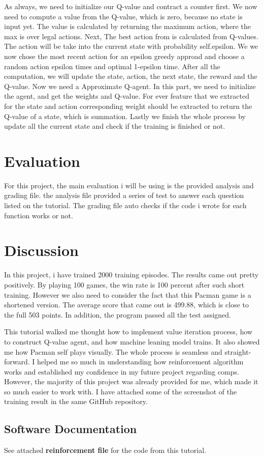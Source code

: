 \documentclass[10pt,twocolumn]{article}
\begin{document}
    As always, we need to initialize our Q-value and contract a counter first. We now need to compute a value from the Q-value, which is zero, because no state is input yet. The value is calculated by returning the maximum action, where the max is over legal actions. Next, The best action from is calculated from Q-values. The action will be take into the current state with probability self.epsilon. We we now chose the most recent action for an epsilon greedy approad and choose a random action epsilon times and optimal 1-epsilon time. After all the computation, we will update the state, action, the next state, the reward and the Q-value. Now we need a Approximate Q-agent. In this part, we need to initialize the agent, and get the weights and Q-value. For ever feature that we extracted for the state and action corresponding weight should be extracted to return the Q-value of a state, which is summation. Lastly we finish the whole process by update all the current state and check if the training is finished or not. 
    

\section{Evaluation}
    For this project, the main evaluation i will be using is the provided analysis and grading file. the analysis file provided a series of test to answer each question listed on the tutorial. The grading file auto checks if the code i wrote for each function works or not. 
    
\section{Discussion}
    In this project, i have trained 2000 training episodes. The results came out pretty positively. By playing 100 games, the win rate is 100 percent after such short training. However we also need to consider the fact that this Pacman game is a shortened version. The average score that came out is 499.88, which is close to the full 503 points. In addition, the program passed all the test assigned. 
    
    This tutorial walked me thought how to implement value iteration process, how to construct Q-value agent, and how machine leaning model trains. It also showed me how Pacman self plays visually. The whole process is seamless and straight-forward. I helped me so much in understanding how reinforcement algorithm works and established my confidence in my future project regarding comps. However, the majority of this project was already provided for me, which made it so much easier to work with. I have attached some of the screenshot of the training result in the same GitHub repository.

\subsection{Software Documentation}
    See attached \textbf{reinforcement file} for the code from this tutorial.

\printbibliography 
\end{document}
